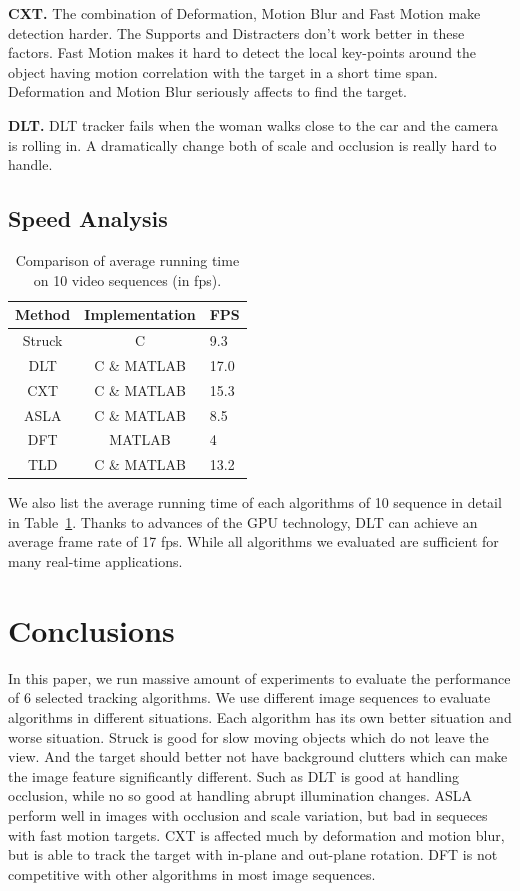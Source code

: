 \documentclass{acm_proc_article-sp}
\begin{document}
\textbf{CXT.} The combination of Deformation, Motion Blur and Fast Motion make detection harder. The Supports and Distracters don't work better in these factors. Fast Motion makes it hard to detect the local key-points around the object having motion correlation with the target in a short time span. Deformation and Motion Blur seriously affects to find the target.

\textbf{DLT.} DLT tracker fails when the woman walks close to the car and the camera is rolling in. A dramatically change both of scale and occlusion is really hard to handle.

\subsection{Speed Analysis}

\begin{table}
	\centering
	\begin{tabular}{|c|c|l|} \hline
		Method & Implementation & FPS\\ \hline
		Struck & C & 9.3\\ \hline
		DLT & C \& MATLAB & 17.0\\ \hline
		CXT & C \& MATLAB & 15.3\\ \hline
		ASLA & C \& MATLAB & 8.5\\ \hline
		DFT & MATLAB & 4\\ \hline
		TLD & C \& MATLAB & 13.2\\ \hline
	\end{tabular}
	\caption{Comparison of average running time on 10 video sequences (in fps).}
	\label{table:time}
\end{table}

We also list the average running time of each algorithms of 10 sequence in detail in Table~\ref{table:time}. Thanks to advances of the GPU technology, DLT can achieve an average frame rate of 17 fps. While all algorithms we evaluated are sufficient for many real-time applications.

\section{Conclusions}
In this paper, we run massive amount of experiments to evaluate the performance of 6 selected tracking algorithms.
We use different image sequences to evaluate algorithms in different situations.
Each algorithm has its own better situation and worse situation.
Struck is good for slow moving objects which do not leave the view. And the target should better not have background clutters which can make the image feature significantly different.
Such as DLT is good at handling occlusion, while no so good at handling abrupt illumination changes.
ASLA perform well in images with occlusion and scale variation, but bad in sequeces with fast motion targets.
CXT is affected much by deformation and motion blur, but is able to track the target with in-plane and out-plane rotation.
DFT is not competitive with other algorithms in most image sequences.
\end{document}
